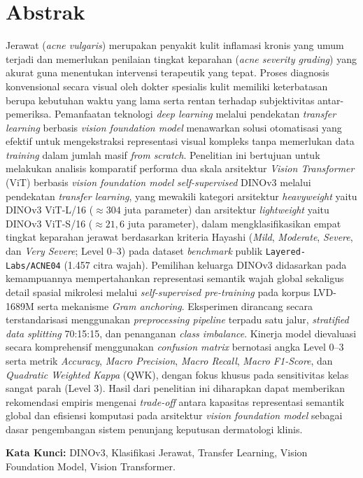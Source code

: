 \chapter*{Abstrak}

Jerawat (\textit{acne vulgaris}) merupakan penyakit kulit inflamasi kronis yang umum terjadi dan memerlukan penilaian tingkat keparahan (\textit{acne severity grading}) yang akurat guna menentukan intervensi terapeutik yang tepat. Proses diagnosis konvensional secara visual oleh dokter spesialis kulit memiliki keterbatasan berupa kebutuhan waktu yang lama serta rentan terhadap subjektivitas antar-pemeriksa. Pemanfaatan teknologi \textit{deep learning} melalui pendekatan \textit{transfer learning} berbasis \textit{vision foundation model} menawarkan solusi otomatisasi yang efektif untuk mengekstraksi representasi visual kompleks tanpa memerlukan data \textit{training} dalam jumlah masif \textit{from scratch}. Penelitian ini bertujuan untuk melakukan analisis komparatif performa dua skala arsitektur \textit{Vision Transformer} (ViT) berbasis \textit{vision foundation model} \textit{self-supervised} DINOv3 melalui pendekatan \textit{transfer learning}, yang mewakili kategori arsitektur \textit{heavyweight} yaitu DINOv3 ViT-L/16 ($\approx 304$ juta parameter) dan arsitektur \textit{lightweight} yaitu DINOv3 ViT-S/16 ($\approx 21,6$ juta parameter), dalam mengklasifikasikan empat tingkat keparahan jerawat berdasarkan kriteria Hayashi (\textit{Mild}, \textit{Moderate}, \textit{Severe}, dan \textit{Very Severe}; Level 0--3) pada dataset \textit{benchmark} publik \texttt{Layered-Labs/ACNE04} (1.457 citra wajah). Pemilihan keluarga DINOv3 didasarkan pada kemampuannya mempertahankan representasi semantik wajah global sekaligus detail spasial mikrolesi melalui \textit{self-supervised pre-training} pada korpus LVD-1689M serta mekanisme \textit{Gram anchoring}. Eksperimen dirancang secara terstandarisasi menggunakan \textit{preprocessing pipeline} terpadu satu jalur, \textit{stratified data splitting} 70:15:15, dan penanganan \textit{class imbalance}. Kinerja model dievaluasi secara komprehensif menggunakan \textit{confusion matrix} bernotasi angka Level 0--3 serta metrik \textit{Accuracy}, \textit{Macro Precision}, \textit{Macro Recall}, \textit{Macro F1-Score}, dan \textit{Quadratic Weighted Kappa} (QWK), dengan fokus khusus pada sensitivitas kelas sangat parah (Level 3). Hasil dari penelitian ini diharapkan dapat memberikan rekomendasi empiris mengenai \textit{trade-off} antara kapasitas representasi semantik global dan efisiensi komputasi pada arsitektur \textit{vision foundation model} sebagai dasar pengembangan sistem penunjang keputusan dermatologi klinis.

\vspace{0.5 cm}
\begin{flushleft}
    {\textbf{Kata Kunci:} DINOv3, Klasifikasi Jerawat, Transfer Learning, Vision Foundation Model, Vision Transformer.}
\end{flushleft}